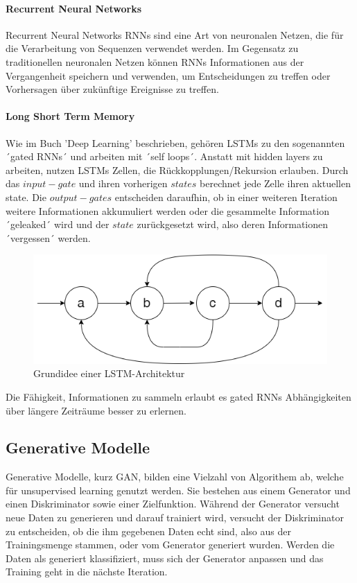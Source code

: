 \paragraph*{Recurrent Neural Networks}
Recurrent Neural Networks \ac{RNN}s sind eine Art von neuronalen Netzen, die für die
Verarbeitung von Sequenzen verwendet werden. Im Gegensatz zu traditionellen neuronalen Netzen
können RNNs Informationen aus der Vergangenheit speichern und verwenden, um Entscheidungen
zu treffen oder Vorhersagen über zukünftige Ereignisse zu treffen.


\paragraph*{Long Short Term Memory}
Wie im Buch ’Deep Learning’\cite{Goodfellow-et-al-2016} beschrieben, gehören
\ac{LSTM}s zu den sogenannten ´gated \acp{RNN}´ und arbeiten mit ´self loops´.
Anstatt mit hidden layers zu arbeiten, nutzen \acp{LSTM} Zellen, die Rückkopplungen/Rekursion erlauben.
Durch das \(input-gate\) und ihren vorherigen \(state s\) berechnet jede Zelle ihren aktuellen state.
Die \(output-gates\) entscheiden daraufhin, ob in einer weiteren Iteration weitere Informationen
akkumuliert werden oder die gesammelte Information ´geleaked´ wird und der \(state\) zurückgesetzt wird,
also deren Informationen ´vergessen´ werden.

\begin{figure}[htbp]
    \centering
    \includegraphics[width=0.9\linewidth]{includes/figures/LSTM.png}
    \caption{Grundidee einer LSTM-Architektur}
    \label{fig:diagram}
\end{figure}

Die Fähigkeit, Informationen zu sammeln erlaubt es gated \acp{RNN} Abhängigkeiten über
längere Zeiträume besser zu erlernen.


\subsection{Generative Modelle}
Generative Modelle, kurz \ac{GAN}, bilden eine Vielzahl von Algorithem ab,
welche für unsupervised learning genutzt werden. Sie bestehen aus einem Generator und einen
Diskriminator sowie einer Zielfunktion. Während der Generator versucht neue Daten zu
generieren und darauf trainiert wird, versucht der Diskriminator zu entscheiden, ob die ihm gegebenen
Daten echt sind, also aus der Trainingsmenge stammen, oder vom Generator generiert wurden.
Werden die Daten als generiert klassifiziert, muss sich der Generator anpassen und das Training
geht in die nächste Iteration.

